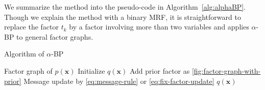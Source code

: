 \documentclass{article}
\begin{document}
We summarize the method into the pseudo-code in Algorithm~\autoref{alg:alphaBP}. Though we explain the method with a binary MRF, it is straightforward to replace the factor $t_k$ by a factor involving more than two variables and applies $\alpha$-BP to general factor graphs.
\begin{algorithm}
  \caption{Algorithm of $\alpha$-BP}\label{alg:alphaBP}
  \begin{algorithmic}[1]
    \renewcommand{\algorithmicrequire}{\textbf{Input:}}
    \renewcommand{\algorithmicensure}{\textbf{Output:}}
    \REQUIRE Factor graph of $p(\bm{x})$
    \STATE Initialize $q(\bm{x})$
    \STATE Add prior factor as \autoref{fig:factor-graph-with-prior}
    \ENDIF
    \STATE Message update by \autoref{eq:message-rule} or \autoref{eq:fix-factor-update}
    \ENDFOR
    \ENDWHILE
    \RETURN $q(\bm{x})$ 
  \end{algorithmic} 
\end{algorithm}
\end{document}
